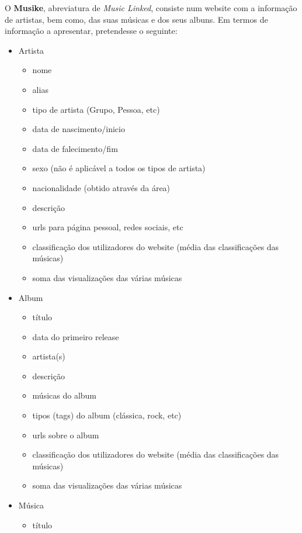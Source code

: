 \documentclass{article}
\begin{document}
O \textbf{Musike}, abreviatura de \textit{Music Linked}, consiste num website com a informação de artistas, bem como, das suas músicas e dos seus albuns. Em termos de informação a apresentar, pretendesse o seguinte:
\begin{itemize}
    \item Artista
        \begin{itemize}
            \item nome
            \item alias
            \item tipo de artista (Grupo, Pessoa, etc)
            \item data de nascimento/inicio
            \item data de falecimento/fim
            \item sexo (não é aplicável a todos os tipos de artista)
            \item nacionalidade (obtido através da área)
            \item descrição
            \item urls para página pessoal, redes sociais, etc
            \item classificação dos utilizadores do website (média das classificações das músicas)
            \item soma das visualizações das várias músicas
        \end{itemize}
    \item Album
        \begin{itemize}
            \item título
            \item data do primeiro release
            \item artista(s)
            \item descrição
            \item músicas do album
            \item tipos (tags) do album (clássica, rock, etc)
            \item urls sobre o album
            \item classificação dos utilizadores do website (média das classificações das músicas)
            \item soma das visualizações das várias músicas
        \end{itemize}
    \item Música
        \begin{itemize}
            \item título

\end{itemize}
\end{itemize}
\end{document}
